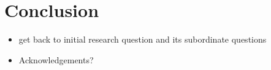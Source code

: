 \chapter{Conclusion}
\label{chap:conclusion}

\begin{itemize}
  \item
    get back to initial research question and its subordinate questions
  \item
    Acknowledgements?
\end{itemize}